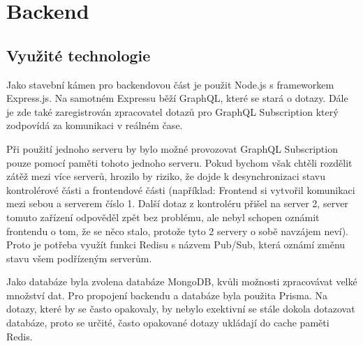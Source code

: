 \section{Backend}

\subsection{Využité technologie}
Jako stavební kámen pro backendovou část je použit Node.js s frameworkem Express.js. Na samotném Expressu běží GraphQL, které se stará o dotazy. Dále je zde také zaregistrován zpracovatel dotazů pro GraphQL Subscription který zodpovídá za komunikaci v reálném čase.\par
Při použití jednoho serveru by bylo možné provozovat GraphQL Subscription pouze pomocí paměti tohoto jednoho serveru. Pokud bychom však chtěli rozdělit zátěž mezi více serverů, hrozilo by riziko, že dojde k desynchronizaci stavu kontrolérové části a frontendové části (například: Frontend si vytvořil komunikaci mezi sebou a serverem číslo 1. Další dotaz z kontroléru přišel na server 2, server tomuto zařízení odpověděl zpět bez problému, ale nebyl schopen oznámit frontendu o tom, že se něco stalo, protože tyto 2 servery o sobě navzájem neví). Proto je potřeba využít funkci Redisu s názvem Pub/Sub\cite{PubSub}, která oznámí změnu stavu všem podřízeným serverům.\par
Jako databáze byla zvolena databáze MongoDB, kvůli možnosti zpracovávat velké množství dat. Pro propojení backendu a databáze byla použita Prisma. Na dotazy, které by se často opakovaly, by nebylo exektivní se stále dokola dotazovat databáze, proto se určité, často opakované dotazy ukládají do cache paměti Redis.\par

